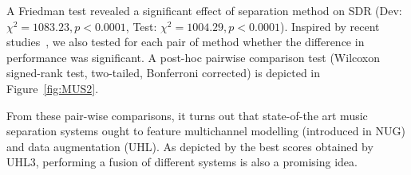 A Friedman test revealed a significant effect of separation method on SDR (Dev: $\chi^2=1083.23, p < 0.0001$, Test: $\chi^2=1004.29, p < 0.0001$).
Inspired by recent studies~\cite{simpsonEVAL}, we also tested for each pair of method whether the difference in performance was significant. A post-hoc pairwise comparison test (Wilcoxon signed-rank test, two-tailed, Bonferroni corrected) is depicted in Figure~\ref{fig:MUS2}.

From these pair-wise comparisons, it turns out that state-of-the art music separation systems ought to feature multichannel modelling (introduced in NUG) and data augmentation (UHL). As depicted by the best scores obtained by UHL3, performing a fusion of different systems is also a promising idea.

\begin{figure*}[htbp]
  \begin{center}
  \end{center}
  \caption{Results for the SDR of vocals on MUS task for Dev and Test.}%
\label{fig:MUS1}
\end{figure*}

\begin{figure*}[htbp]
  \begin{center}
  \end{center}
  \caption{P-values of Pair-wise difference of Wilcoxon signed-rank test of SDR vocals over method. (upper triangle: Test, lower triangle: Dev). Values $p > 0.05$ indicate no significant differences between the two group results.}
\label{fig:MUS2}
\end{figure*}
